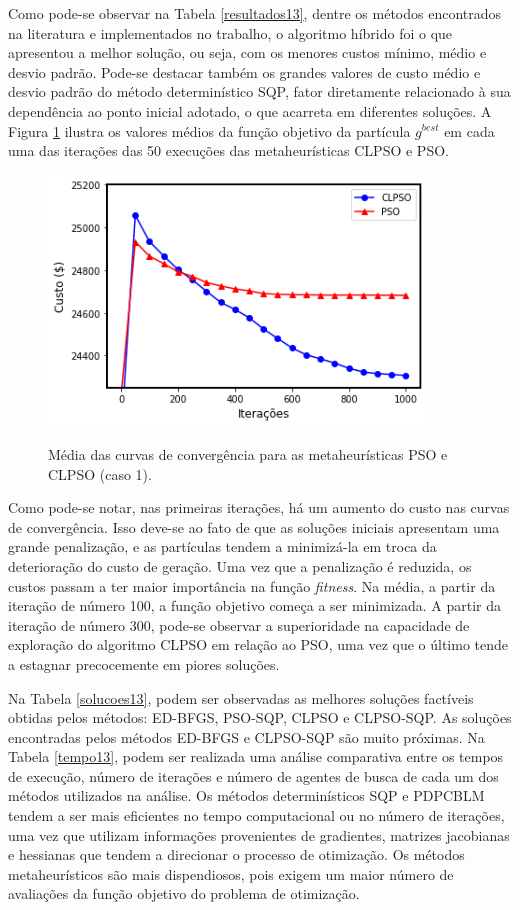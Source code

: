 \documentclass[
	12pt,				%
	openany,			%
	twoside,			%
	a4paper,			%
	chapter=TITLE,		%
	section=Title,		%
	subsection=Title,	%
	subsubsection=Title,%
	english,			%
	french,				%
	spanish,			%
	brazil			%
	]{abntex2}
\begin{document}
\begin{ERRATA}
Como pode-se observar na Tabela \ref{resultados13}, dentre os métodos encontrados na literatura e implementados no trabalho, o algoritmo híbrido foi o que apresentou a melhor solução, ou seja, com os menores custos mínimo, médio e desvio padrão. Pode-se destacar também os grandes valores de custo médio e desvio padrão do método determinístico SQP, fator diretamente relacionado à sua dependência ao ponto inicial adotado, o que acarreta em diferentes soluções. A Figura \ref{conv13} ilustra os valores médios da função objetivo da partícula $g^{best}$ em cada uma das iterações das 50 execuções das metaheurísticas CLPSO e PSO.

\begin{figure}[!h]
\centering
\caption{Média das curvas de convergência para as metaheurísticas PSO e CLPSO (caso 1).}
\includegraphics[width=100mm]{images/convergence_13.png}
\label{conv13}
\end{figure}

Como pode-se notar, nas primeiras iterações, há um aumento do custo nas curvas de convergência. Isso deve-se ao fato de que as soluções iniciais apresentam uma grande penalização, e as partículas tendem a minimizá-la em troca da deterioração do custo de geração. Uma vez que a penalização é reduzida, os custos passam a ter maior importância na função \emph{fitness}. Na média, a partir da iteração de número 100, a função objetivo começa a ser minimizada. A partir da iteração de número 300, pode-se observar a superioridade na capacidade de exploração do algoritmo CLPSO em relação ao PSO, uma vez que o último tende a estagnar precocemente em piores soluções. 

Na Tabela \ref{solucoes13}, podem ser observadas as melhores soluções factíveis obtidas pelos métodos: ED-BFGS, PSO-SQP, CLPSO e CLPSO-SQP. As soluções encontradas pelos métodos ED-BFGS e CLPSO-SQP são muito próximas. Na Tabela \ref{tempo13}, podem ser realizada uma análise comparativa entre os tempos de execução, número de iterações e número de agentes de busca de cada um dos métodos utilizados na análise. Os métodos determinísticos SQP e PDPCBLM tendem a ser mais eficientes no tempo computacional ou no número de iterações, uma vez que utilizam informações provenientes de gradientes, matrizes jacobianas e hessianas que tendem a direcionar o processo de otimização. Os métodos metaheurísticos são mais dispendiosos, pois exigem um maior número de avaliações da função objetivo do problema de otimização. 


\end{ERRATA}
\end{document}

